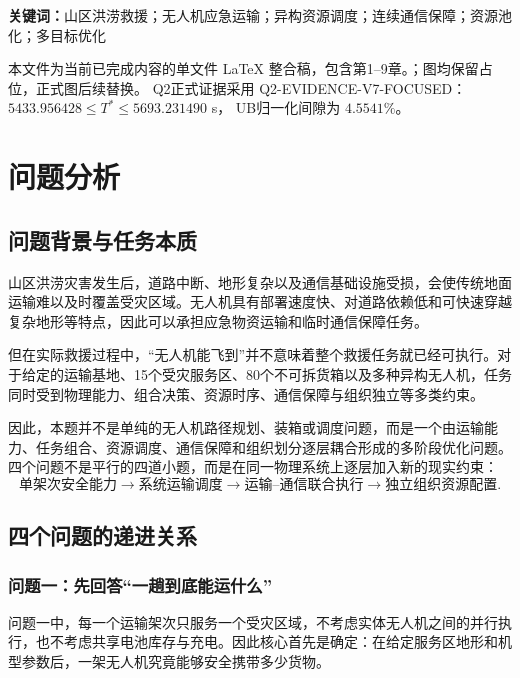 \documentclass[UTF8,a4paper,12pt]{ctexart}
\begin{document}
\noindent\textbf{关键词：}山区洪涝救援；无人机应急运输；异构资源调度；连续通信保障；资源池化；多目标优化


\begin{center}
\small
本文件为当前已完成内容的单文件 \LaTeX{} 整合稿，包含第1--9章。；图均保留占位，正式图后续替换。
Q2正式证据采用 Q2-EVIDENCE-V7-FOCUSED：$5433.956428\le T^*\le5693.231490$ s，
UB归一化间隙为 $4.5541\%$。
\end{center}

\tableofcontents
\newpage


\section{问题分析}
\label{sec:problem_analysis}

\subsection{问题背景与任务本质}

山区洪涝灾害发生后，道路中断、地形复杂以及通信基础设施受损，会使传统地面运输难以及时覆盖受灾区域。无人机具有部署速度快、对道路依赖低和可快速穿越复杂地形等特点，因此可以承担应急物资运输和临时通信保障任务\cite{dorling2017,altheeb2017relief}。

但在实际救援过程中，“无人机能飞到”并不意味着整个救援任务就已经可执行。对于给定的运输基地、15个受灾服务区、80个不可拆货箱以及多种异构无人机，任务同时受到物理能力、组合决策、资源时序、通信保障与组织独立等多类约束。

因此，本题并不是单纯的无人机路径规划、装箱或调度问题，而是一个由运输能力、任务组合、资源调度、通信保障和组织划分逐层耦合形成的多阶段优化问题。四个问题不是平行的四道小题，而是在同一物理系统上逐层加入新的现实约束：
\[
\boxed{
\text{单架次安全能力}
\rightarrow
\text{系统运输调度}
\rightarrow
\text{运输--通信联合执行}
\rightarrow
\text{独立组织资源配置}
}.
\]

\subsection{四个问题的递进关系}

\subsubsection{问题一：先回答“一趟到底能运什么”}

问题一中，每一个运输架次只服务一个受灾区域，不考虑实体无人机之间的并行执行，也不考虑共享电池库存与充电。因此核心首先是确定：在给定服务区地形和机型参数后，一架无人机究竟能够安全携带多少货物。
\end{document}

